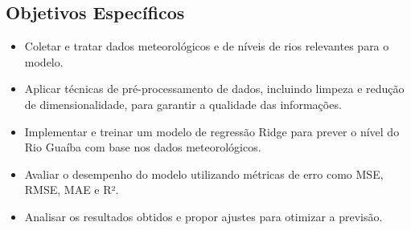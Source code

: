 \subsection{Objetivos Específicos}

\begin{itemize}
    \item Coletar e tratar dados meteorológicos e de níveis de rios relevantes para o modelo.
    \item Aplicar técnicas de pré-processamento de dados, incluindo limpeza e redução de dimensionalidade, para garantir a qualidade das informações.
    \item Implementar e treinar um modelo de regressão Ridge para prever o nível do Rio Guaíba com base nos dados meteorológicos.
    \item Avaliar o desempenho do modelo utilizando métricas de erro como MSE, RMSE, MAE e R².
    \item Analisar os resultados obtidos e propor ajustes para otimizar a previsão.
\end{itemize}